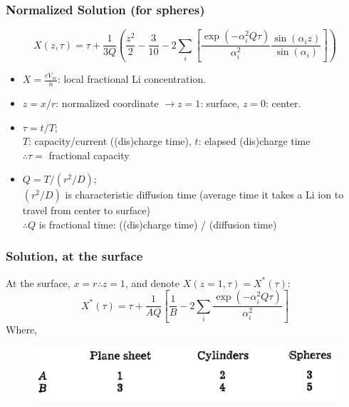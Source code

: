 \documentclass{beamer}
\begin{document}
\begin{frame}
\frametitle{Normalized Solution (for spheres)}

\begin{equation*}
X(z, \tau) = \tau + \frac{1}{3Q} \left(\frac{z^2}{2} - \frac{3}{10} -2 \sum_{i} \left[\frac{\exp(-\alpha_i^2 Q\tau)}{\alpha_i^2} \frac{\sin(\alpha_i z)}{\sin(\alpha_i)} \right] \right)
\end{equation*}
\begin{itemize}
	\item $X = \frac{cV_m}{n}$: local fractional Li concentration.
	\item $z = x/r$: normalized coordinate  $\rightarrow z=1$: surface, $z=0$: center.
	\item $\tau = t/T$; \\
		  $T$: capacity/current ((dis)charge time), $t$: elapsed (dis)charge time\\ 
		  $\therefore \tau=$ fractional capacity
	\item $Q = T/(r^2/D)$; \\
		  $(r^2/D)$ is characteristic diffusion time (average time it takes a Li ion to travel from center to surface) \\
		  $\therefore Q$ is fractional time: ((dis)charge time) / (diffusion time)
\end{itemize}

\end{frame}

\begin{frame}
\frametitle{Solution, at the surface}

At the surface, $x=r \therefore z=1$, and denote $X(z=1, \tau) = X^*(\tau)$:
\begin{equation*}
X^*(\tau) = \tau + \frac{1}{AQ} \left[ \frac{1}{B} - 2 \sum_{i}\frac{\exp(-\alpha_i^2 Q\tau)}{\alpha_i^2}  \right]
\end{equation*}
Where, 
\begin{figure}
	\includegraphics[width=0.65\linewidth]{figs/atlung_constants.pdf}
\end{figure}

\end{frame}
\end{document}
